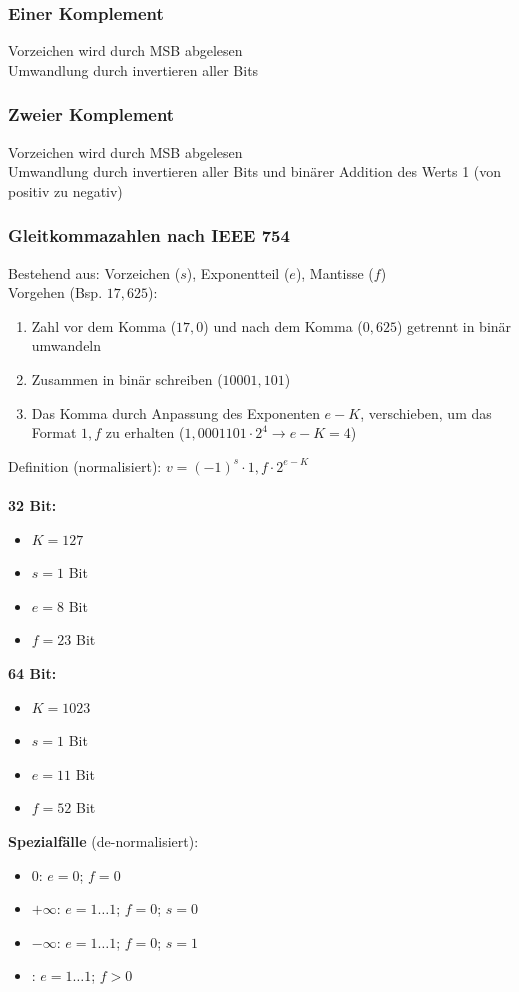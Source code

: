 \documentclass[ngerman, threecolumn, 8pt]{latex4ei/latex4ei_sheet}
\begin{document}
	\subsubsection{Einer Komplement}
	Vorzeichen wird durch MSB abgelesen\\
	Umwandlung durch invertieren aller Bits
	\subsubsection{Zweier Komplement}
	Vorzeichen wird durch MSB abgelesen\\
	Umwandlung durch invertieren aller Bits und binärer Addition des Werts 1 (von positiv zu negativ)


	\subsubsection{Gleitkommazahlen nach IEEE 754}
	Bestehend aus: Vorzeichen ($s$), Exponentteil ($e$), Mantisse ($f$)\\
	Vorgehen (Bsp. $17,625$): 
	\begin{enumerate}
	\item Zahl vor dem Komma ($17,0$) und nach dem Komma ($0,625$) getrennt in binär umwandeln
	\item Zusammen in binär schreiben ($10001,101$)
	\item Das Komma durch Anpassung des Exponenten $e-K$, verschieben, um das Format $1,f$ zu erhalten ($1,0001101 \cdot 2^4 \rightarrow e-K=4$) \\
	\end{enumerate}
\begin{sectionbox}
	Definition (normalisiert): $v=(-1)^s \cdot 1,f \cdot 2^{e-K}$\\\\
    \textbf{32 Bit:}
        \begin{itemize}\itemsep0pt
            \item $K=127$
            \item $s = 1$ Bit
            \item $e = 8$ Bit
            \item $f = 23$ Bit
        \end{itemize}
    \textbf{64 Bit:}
        \begin{itemize}\itemsep0pt
            \item $K=1023$
            \item $s = 1$ Bit
            \item $e = 11$ Bit
            \item $f = 52$ Bit
        \end{itemize}
	\textbf{Spezialfälle} (de-normalisiert):
	\begin{itemize}\itemsep0pt
	\item 0: $e=0$; $f=0$
	\item $+\infty$: $e=1\dots1$; $f=0$; $s=0$
	\item $-\infty$: $e=1\dots1$; $f=0$; $s=1$
	\item {}: $e=1\dots1$; $f>0$
	\end{itemize}
\end{sectionbox}
\end{document}
